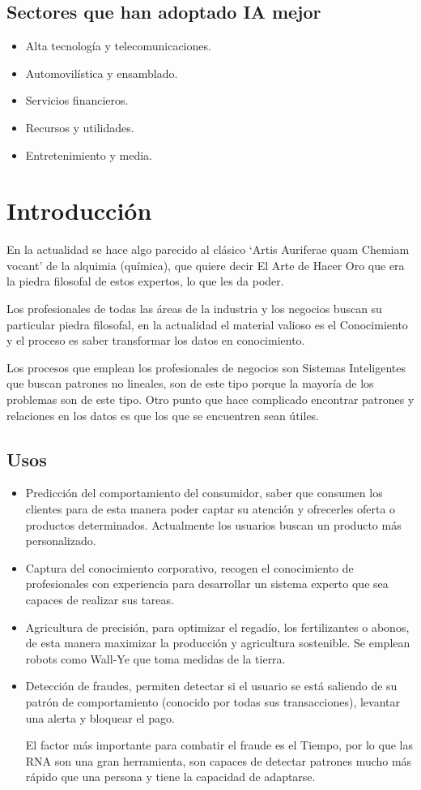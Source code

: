 \documentclass[12pt, twoside, openright]{report} %
\begin{document}
\subsection{Sectores que han adoptado IA mejor}
\begin{itemize}
	\item Alta tecnología y telecomunicaciones.
	\item Automovilística y ensamblado.
	\item Servicios financieros.
	\item Recursos y utilidades.
	\item Entretenimiento y media.
\end{itemize}

\section{Introducción}
En la actualidad se hace algo parecido al clásico ‘Artis Auriferae quam Chemiam vocant’ de la alquimia (química), que quiere decir El Arte de Hacer Oro que era la piedra filosofal de estos expertos, lo que les da poder.

Los profesionales de todas las áreas de la industria y los negocios buscan su particular piedra filosofal, en la actualidad el material valioso es el Conocimiento y el proceso es saber transformar los datos en conocimiento.

Los procesos que emplean los profesionales de negocios son Sistemas Inteligentes que buscan patrones no lineales, son de este tipo porque la mayoría de los problemas son de este tipo. Otro punto que hace complicado encontrar patrones y relaciones en los datos es que los que se encuentren sean útiles.

\subsection{Usos}
\begin{itemize}
	\item Predicción del comportamiento del consumidor, saber que consumen los clientes para de esta manera poder captar su atención y ofrecerles oferta o productos determinados. Actualmente los usuarios buscan un producto más personalizado.
	\item Captura del conocimiento corporativo, recogen el conocimiento de profesionales con experiencia para desarrollar un sistema experto que sea capaces de realizar sus tareas.
	\item Agricultura de precisión, para optimizar el regadío, los fertilizantes o abonos, de esta manera maximizar la producción y agricultura sostenible. Se emplean robots como Wall-Ye que toma medidas de la tierra.
	\item Detección de fraudes, permiten detectar si el usuario se está saliendo de su patrón de comportamiento (conocido por todas sus transacciones), levantar una alerta y bloquear el pago.
	      
	      El factor más importante para combatir el fraude es el Tiempo, por lo que las RNA son una gran herramienta, son capaces de detectar patrones mucho más rápido que una persona y tiene la capacidad de adaptarse.
\end{itemize}
\pagebreak
\end{document}

